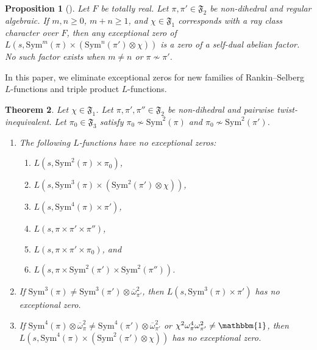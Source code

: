 \documentclass[11pt]{amsart}
\newtheorem{theorem}{Theorem}[section]
\newtheorem{proposition}[theorem]{Proposition}
\theoremstyle{remark}
\newcommand{\Sym}{\mathrm{Sym}}
\renewcommand{\bar}{\overline}
\numberwithin{equation}{section}
\begin{document}
\begin{proposition}[{\cite[Theorem 1.1]{Thorner_Siegel}}]
\label{prop:Thorner}
Let $F$ be totally real.  Let $\pi,\pi'\in\mathfrak{F}_2$ be non-dihedral and regular algebraic.  If $m,n\geq 0$, $m+n\geq 1$, and $\chi\in\mathfrak{F}_1$ corresponds with a ray class character over $F$, then any exceptional zero of $L(s,\Sym^m(\pi)\times(\Sym^n(\pi')\otimes\chi))$ is a zero of a self-dual abelian factor.  No such factor exists when $m\neq n$ or $\pi\not\sim\pi'$.
\end{proposition}

In this paper, we eliminate exceptional zeros for new families of Rankin--Selberg $L$-functions and triple product $L$-functions.

\begin{theorem}
\label{thm:main}
Let $\chi\in\mathfrak{F}_1$.  Let $\pi,\pi',\pi''\in\mathfrak{F}_2$ be non-dihedral and pairwise twist-inequivalent.  Let $\pi_0\in\mathfrak{F}_3$ satisfy $\pi_0\not\sim\Sym^2(\pi)$ and $\pi_0\not\sim\Sym^2(\pi')$.
\begin{enumerate}[leftmargin=*]
\item The following $L$-functions have no exceptional zeros:
\begin{enumerate}[leftmargin=*]
	\item $L(s,\mathrm{Sym}^2(\pi)\times\pi_0)$,
	\item $L(s,\mathrm{Sym}^3(\pi)\times(\mathrm{Sym}^2(\pi')\otimes\chi))$,
	\item $L(s,\mathrm{Sym}^4(\pi)\times\pi')$,
	\item $L(s,\pi\times\pi'\times\pi'')$,
	\item $L(s,\pi\times\pi'\times\pi_0)$, and
	\item $L(s,\pi\times\mathrm{Sym}^2(\pi')\times\mathrm{Sym}^2(\pi''))$.
\end{enumerate}
\item  If $\mathrm{Sym}^3(\pi)\neq\mathrm{Sym}^3(\pi')\otimes \overline{\omega}_{\pi'}^2$, then $L(s,\mathrm{Sym}^3(\pi)\times \pi')$ has no exceptional zero.
\item If $\mathrm{Sym}^4(\pi)\otimes\bar{\omega}_{\pi}^2\neq\mathrm{Sym}^4(\pi')\otimes\bar{\omega}_{\pi'}^2$ or $\chi^2\omega_{\pi}^4\omega_{\pi'}^2\neq\mathbbm{1}$, then $L(s,\mathrm{Sym}^4(\pi)\times(\mathrm{Sym}^2(\pi')\otimes\chi))$ has no exceptional zero.
\end{enumerate}
\end{theorem}
\end{document}

